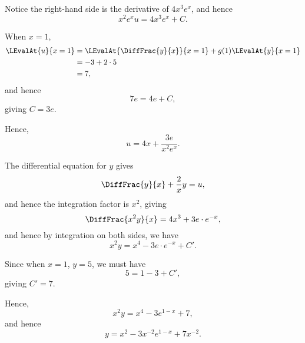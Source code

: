 \begin{enumerate}
          Notice the right-hand side is the derivative of \(4x^3 e^x\), and hence
          \[
              x^2 e^x u = 4 x^3 e^x + C.
          \]

          When \(x = 1\),
          \begin{align*}
              \LEvalAt{u}{x = 1} & = \LEvalAt{\DiffFrac{y}{x}}{x = 1} + g(1) \LEvalAt{y}{x = 1} \\
                                 & = -3 + 2 \cdot 5                                             \\
                                 & = 7,
          \end{align*}
          and hence
          \[
              7e = 4e + C,
          \]
          giving \(C = 3e\).

          Hence,
          \[
              u = 4 x + \frac{3e}{x^2 e^x}.
          \]

          The differential equation for \(y\) gives
          \[
              \DiffFrac{y}{x} + \frac{2}{x} y = u,
          \]
          and hence the integration factor is \(x^2\), giving
          \[
              \DiffFrac{x^2 y}{x} = 4x^3 + 3e \cdot e^{-x},
          \]
          and hence by integration on both sides, we have
          \[
              x^2 y = x^4 - 3e \cdot e^{-x} + C'.
          \]

          Since when \(x = 1\), \(y = 5\), we must have
          \[
              5 = 1 - 3 + C',
          \]
          giving \(C' = 7\).

          Hence,
          \[
              x^2 y = x^4 - 3e^{1 - x} + 7,
          \]
          and hence
          \[
              y = x^2 - 3 x^{-2} e^{1 - x} + 7 x^{-2}.
          \]
\end{enumerate}